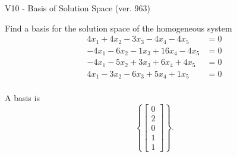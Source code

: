 \begin{exercise}
  \begin{exerciseTitle}V10 - Basis of Solution Space (ver. 963)\end{exerciseTitle}
  \begin{exerciseStatement}
    Find a basis for the solution space of the homogeneous system 
\begin{align*}
 4 x_ 1 + 4 x_ 2 -3 x_ 3 -4 x_ 4 -4 x_ 5 &= 0  \\ 
  -4 x_ 1 -6 x_ 2 -1 x_ 3 + 16 x_ 4 -4 x_ 5 &= 0  \\ 
  -4 x_ 1 -5 x_ 2 + 3 x_ 3 + 6 x_ 4 + 4 x_ 5 &= 0  \\ 
  4 x_ 1 -3 x_ 2 -6 x_ 3 + 5 x_ 4 + 1 x_ 5 &= 0  \\ 
 \end{align*}


 
  \end{exerciseStatement}

  \begin{exerciseAnswer}
   A basis is   
\[\left\{\left[\begin{array}{c}
0 \\
2 \\
0 \\
1 \\
1
\end{array}\right]\right\}.\]

  


  \end{exerciseAnswer}
\end{exercise}